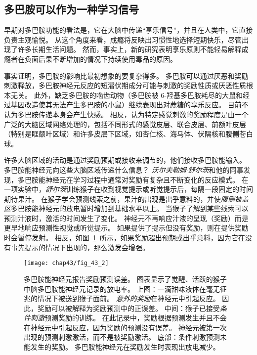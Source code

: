 \subsection{多巴胺可以作为一种学习信号}

早期对多巴胺功能的看法是，它在大脑中传递“享乐信号”，并且在人类中，它直接负责主观愉悦。
从这个角度来看，成瘾将反映出习惯性地选择短期快乐，尽管出现了许多长期生活问题。
然而，事实上，新的研究表明享乐原则不能轻易解释成瘾者在负面后果不断增加的情况下持续使用毒品的原因。


事实证明，多巴胺的影响比最初想象的要复杂得多。
多巴胺可以通过厌恶和奖励刺激释放，多巴胺神经元反应的短潜伏期成分可能与刺激的奖励性质或厌恶性质根本无关。
此外，缺乏多巴胺的啮齿动物（多巴胺被 6-羟基多巴胺耗尽的大鼠和经过基因改造使其无法产生多巴胺的小鼠）继续表现出对蔗糖的享乐反应。
目前不认为多巴胺传递本身会产生快感。
相反，认为特定感觉刺激的奖励程度是由一个广泛的大脑区域网络处理的，包括不同形式的感觉皮层、联合皮层、前额叶皮层（特别是眶额叶区域）和许多皮层下区域，如杏仁核、海马体、伏隔核和腹侧苍白球。


许多大脑区域的活动是通过奖励预期或接收来调节的，他们接收多巴胺能输入。
多巴胺能神经元向这些大脑区域传递什么信息？
\textit{沃尔夫勒姆$\cdot$舒尔茨}和他的同事发现，多巴胺能神经元在学习过程中通常对奖励有复杂且不断变化的反应模式。
在一项实验中，\textit{舒尔茨}训练猴子在收到视觉提示或听觉提示后，每隔一段固定的时间期待果汁。
在猴子学会预测线索之前，果汁的出现是出乎意料的，并使\textit{腹侧被盖区}多巴胺能神经元的放电暂时增加到基础水平以上。
当猴子了解到某些线索可以预测汁液时，激活的时间发生了变化。
神经元不再响应汁液的呈现（奖励）而是更早地响应预测性视觉或听觉提示。
如果提供了提示但没有奖励，则在提供奖励时会暂停发射。
相反，如图~\ref{fig:43_2}~所示，如果奖励超出预期或出乎意料，因为它在没有事先提示的情况下出现的，那么激发会增强。


\begin{figure}[htbp]
	\centering
	\texttt{[image: chap43/fig\_43\_2]}
	\caption{多巴胺能神经元报告奖励预测误差。
		图表显示了觉醒、活跃的猴子中脑多巴胺能神经元记录的放电率。
		上图：一滴甜味液体在毫无征兆的情况下被送到猴子面前。
		\textit{意外的奖励}在神经元中引起反应。
		因此，奖励可以被解释为奖励预测中的正误差。
		中间：猴子已接受\textit{条件刺激}预测奖励的训练。
		在此记录中，奖励根据预测发生并且不会在神经元中引起反应，因为奖励的预测没有误差。
		神经元被第一次出现的预测刺激激活，而不是被奖励激活。
		底部：条件刺激预测未能发生的奖励。
		多巴胺能神经元在奖励发生时表现出放电减少\cite{schultz1997neural}。}
	\label{fig:43_2}
\end{figure}


